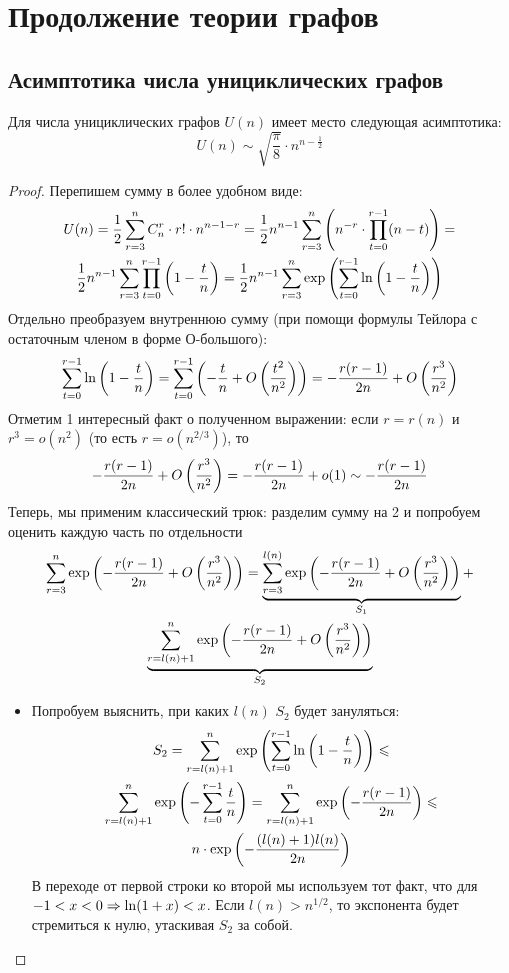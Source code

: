 \section{Продолжение теории графов}

\subsection{Асимптотика числа унициклических графов}

\begin{proposition} \label{asympprop}
	Для числа унициклических графов $U(n)$ имеет место следующая асимптотика:
	\[
		U(n) \sim \sqrt{\frac{\pi}{8}} \cdot n^{n - \frac{1}{2}}
	\]
\end{proposition}

\begin{proof}
	Перепишем сумму в более удобном виде:
	\begin{multline*}
		U(n) = \frac{1}{2} \sum_{r = 3}^n C_n^r \cdot r! \cdot n^{n - 1 - r} = \frac{1}{2} n^{n - 1} \sum_{r = 3}^n \left( n^{-r} \cdot \prod_{t = 0}^ {r - 1} (n - t) \right) =
		\\
		\frac{1}{2} n^{n - 1} \sum_{r = 3}^n \prod_{t = 0}^{r - 1} \left( 1 - \frac{t}{n} \right) = \frac{1}{2} n^{n - 1} \sum_{r = 3}^n \exp\left( \sum_{t = 0}^{r - 1} \ln\left( 1 - \frac{t}{n} \right) \right)
	\end{multline*}
	Отдельно преобразуем внутреннюю сумму (при помощи формулы Тейлора с остаточным членом в форме О-большого):
	\[
		\sum_{t = 0}^{r - 1} \ln\left( 1 - \frac{t}{n} \right) = \sum_{t = 0}^{r - 1} \left( -\frac{t}{n} + O\left( \frac{t^2}{n^2} \right) \right) = -\frac{r(r - 1)}{2n} + O\left( \frac{r^3}{n^2} \right)
	\]
	Отметим 1 интересный факт о полученном выражении: если $r = r(n)$ и $r^3 = o(n^2)$ (то есть $r = o(n^{2/3})$), то
	\[
		-\frac{r(r - 1)}{2n} + O\left( \frac{r^3}{n^2} \right) = -\frac{r(r - 1)}{2n} + o(1) \sim -\frac{r(r - 1)}{2n}
	\]
	Теперь, мы применим классический трюк: разделим сумму на 2 и попробуем оценить каждую часть по отдельности
	\begin{multline*}
		\sum_{r = 3}^n \exp\left( -\frac{r(r - 1)}{2n} + O\left( \frac{r^3}{n^2} \right) \right) = \underbrace{\sum_{r = 3}^{l(n)} \exp\left( -\frac{r(r - 1)}{2n} + O\left( \frac{r^3}{n^2} \right) \right)}_{S_1} +
		\\
		\underbrace{\sum_{r = l(n) + 1}^n \exp\left( -\frac{r(r - 1)}{2n} + O\left( \frac{r^3}{n^2} \right) \right)}_{S_2}
	\end{multline*}
	\begin{itemize}
		\item Попробуем выяснить, при каких $l(n)$ $S_2$ будет зануляться:
		\begin{multline*}
			S_2 = \sum_{r = l(n) + 1}^n \exp\left( \sum_{t = 0}^{r - 1} \ln\left( 1 - \frac{t}{n} \right) \right) \leqslant
			\\
			\sum_{r = l(n) + 1}^n \exp\left( -\sum_{t = 0}^{r - 1} \frac{t}{n} \right) = \sum_{r = l(n) + 1}^n \exp\left( -\frac{r(r - 1)}{2n} \right) \leqslant
			\\
			n \cdot \exp\left( -\frac{(l(n) + 1)l(n)}{2n} \right)
		\end{multline*}
		В переходе от первой строки ко второй мы используем тот факт, что для $-1 < x < 0 \Rightarrow \ln(1 + x) < x$. Если $l(n) > n^{1/2}$, то экспонента будет стремиться к нулю, утаскивая $S_2$ за собой.
		

\end{itemize}
\end{proof}
